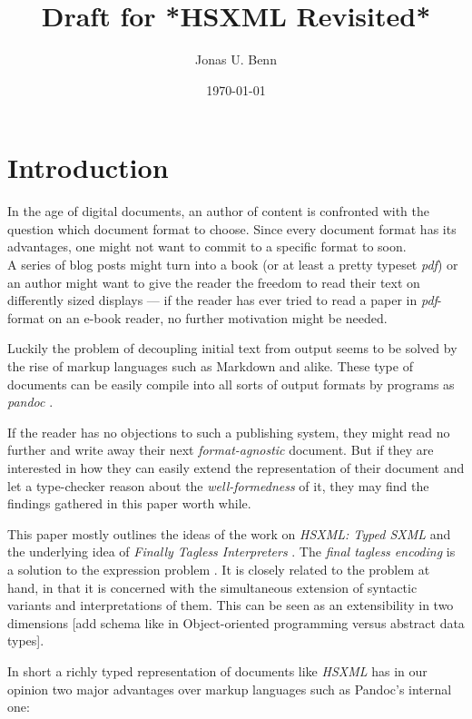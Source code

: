 \documentclass[format=acmsmall, review=true, screen=true, natbib=false]{acmart}
\author{Jonas U. Benn}
\date{\today}
\title[Draft for *HSXML Revisited*]{Draft for *HSXML Revisited*}
\begin{document}
\lstset{language=Haskell}

\maketitle


\section{Introduction}
\label{sec:orgc140eeb}

In the age of digital documents, an author of content is confronted with the
question which document format to choose. Since every document format has its
advantages, one might not want to commit to a specific format to soon. \\
A series of blog posts might turn into a book (or at least a pretty typeset
\emph{pdf}) or an author might want to give the reader the freedom to read
their text on differently sized displays — if the reader has ever tried to read
a paper in \emph{pdf}-format on an e-book reader, no further motivation might
be needed.

Luckily the problem of decoupling initial text from output seems to be solved by
the rise of markup languages such as Markdown and alike. These type of documents
can be easily compile into all sorts of output formats by programs as
\emph{pandoc} \cite{pandoc}.

If the reader has no objections to such a publishing system, they might read no
further and write away their next \emph{format-agnostic} document. But if they
are interested in how they can easily extend the representation of their
document and let a type-checker reason about the \emph{well-formedness} of it,
they may find the findings gathered in this paper worth while.

This paper mostly outlines the ideas of the work on \emph{HSXML: Typed SXML}
\cite{hsxml} and the underlying idea of \emph{Finally Tagless Interpreters}
\cite{finally-tagless}. The \emph{final tagless encoding} is a solution to the
expression problem \cite{expression-problem}. It is closely related to the
problem at hand, in that it is concerned with the simultaneous extension of
syntactic variants and interpretations of them. This can be seen as
an extensibility in two dimensions [add schema like in Object-oriented
programming versus abstract data types].

In short a richly typed representation of documents like \emph{HSXML} has in our
opinion two major advantages over markup languages such as Pandoc’s internal one:
\end{document}
